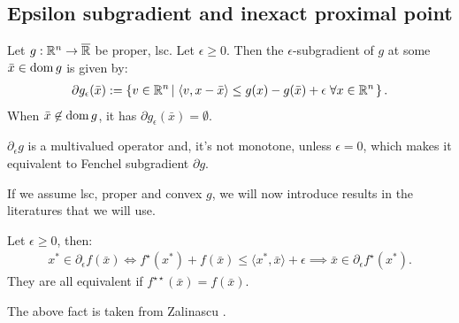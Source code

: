 \documentclass[12pt]{article}
\begin{document}
    \subsection{Epsilon subgradient and inexact proximal point}
        \begin{definition}\label{def:esp-subgrad}
            Let $g: \mathbb R^n \rightarrow \overline {\mathbb R}$ be proper, lsc. 
            Let $\epsilon \ge 0$. 
            Then the $\epsilon$-subgradient of $g$ at some $\bar x \in \operatorname{dom} g$ is given by: 
            $$
            \begin{aligned}
                \partial g_\epsilon(\bar  x) := 
                \left\lbrace
                    v \in \mathbb R^n \left| \; 
                        \langle v, x - \bar  x\rangle \le 
                        g(x) - g(\bar x) + \epsilon \;\forall x \in \mathbb R^n
                    \right. 
                \right\rbrace.
            \end{aligned}
            $$
            When $\bar x \not \in \operatorname{dom} g$, it has $\partial g_\epsilon(\bar x) = \emptyset$. 
        \end{definition}
        \begin{remark}
            $\partial_\epsilon g$ is a multivalued operator and, it's not monotone, unless $\epsilon = 0$, which makes it equivalent to Fenchel subgradient $\partial g$. 
        \end{remark}
        If we assume lsc, proper and convex $g$, we will now introduce results in the literatures that we will use. 
        \begin{fact}\label{fact:esp-fenchel-ineq}
            Let $\epsilon \ge 0$, then:
            \begin{align*}
                x^* \in \partial_\epsilon f(\bar x)\iff f^\star(x^*) + f(\bar x) \le \langle x^*, \bar x\rangle + \epsilon \implies \bar x \in \partial_\epsilon f^\star(x^*).
            \end{align*}
            They are all equivalent if $f^{\star\star}(\bar x) = f(\bar x)$. 
        \end{fact}
        \begin{remark}
            The above fact is taken from Zalinascu \cite[Theorem 2.4.2]{zalinescu_convex_2002}. 
        \end{remark}
\end{document}
